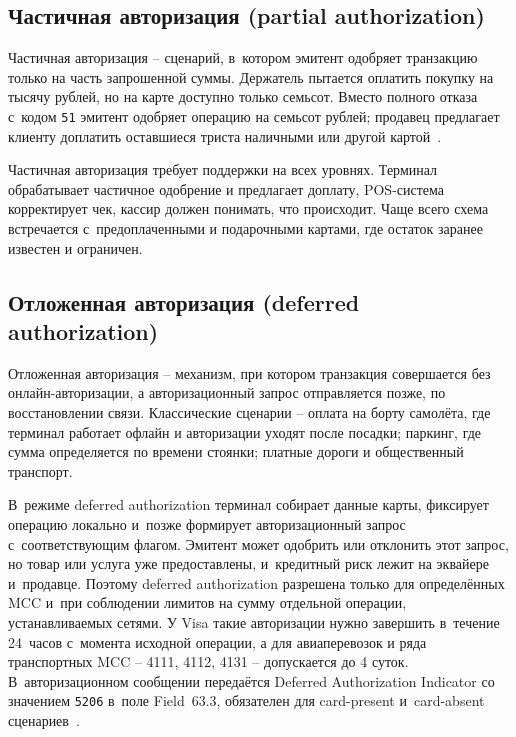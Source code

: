 \subsection*{Частичная авторизация (partial authorization)}

Частичная авторизация -- сценарий, в~котором эмитент одобряет
транзакцию только на часть запрошенной суммы. Держатель
пытается оплатить покупку на тысячу рублей, но на карте доступно
только семьсот. Вместо полного отказа с~кодом \texttt{51} эмитент
одобряет операцию на семьсот рублей; продавец предлагает клиенту
доплатить оставшиеся триста наличными или другой
картой~\cite{visa-tadg,mc-tpr}.

Частичная авторизация требует поддержки на всех уровнях. Терминал
обрабатывает частичное одобрение и предлагает доплату, POS-система
корректирует чек, кассир должен понимать, что происходит. Чаще всего
схема встречается с~предоплаченными и подарочными картами, где остаток
заранее известен и ограничен.

\subsection*{Отложенная авторизация (deferred authorization)}

Отложенная авторизация -- механизм, при котором транзакция совершается
без онлайн-авторизации, а авторизационный запрос отправляется позже,
по восстановлении связи. Классические сценарии -- оплата на борту
самолёта, где терминал работает офлайн и авторизации уходят после
посадки; паркинг, где сумма определяется по времени стоянки;
платные дороги и общественный транспорт.

В~режиме deferred authorization терминал собирает данные карты,
фиксирует операцию локально и~позже формирует авторизационный запрос
с~соответствующим флагом. Эмитент может одобрить или отклонить
этот запрос, но товар или услуга уже предоставлены, и~кредитный риск
лежит на эквайере и~продавце. Поэтому deferred authorization разрешена
только для определённых MCC и~при соблюдении лимитов на сумму
отдельной операции, устанавливаемых сетями. У Visa такие авторизации
нужно завершить в~течение 24~часов с~момента исходной операции,
а для авиаперевозок и ряда транспортных MCC -- 4111, 4112, 4131 --
допускается до 4 суток. В~авторизационном сообщении передаётся
Deferred Authorization Indicator со значением \texttt{5206} в~поле
Field~63.3, обязателен для card-present и~card-absent
сценариев~\cite{visa-tadg,visa-core-rules}.

